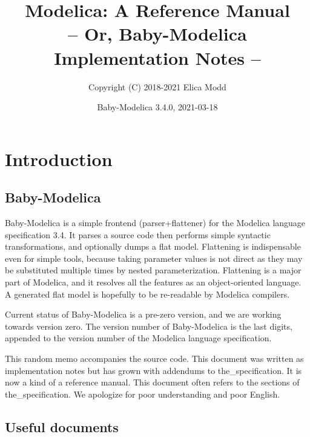 \documentclass[10pt,b5paper]{article}
\title{\bf{}Modelica: A Reference Manual\\
\normalsize{}-- Or, Baby-Modelica Implementation Notes --}
\author{Copyright (C) 2018-2021 Elica Modd}
\date{Baby-Modelica 3.4.0, 2021-03-18}
\begin{document}
\maketitle

\tableofcontents



\section{Introduction}

\subsection{Baby-Modelica}

Baby-Modelica is a simple frontend (parser+flattener) for the Modelica
language specification 3.4.  It parses a source code then performs
simple syntactic transformations, and optionally dumps a flat model.
Flattening is indispensable even for simple tools, because taking
parameter values is not direct as they may be substituted multiple
times by nested parameterization.  Flattening is a major part of
Modelica, and it resolves all the features as an object-oriented
language.  A generated flat model is hopefully to be re-readable by
Modelica compilers.

Current status of Baby-Modelica is a pre-zero version, and we are
working towards version zero.  The version number of Baby-Modelica is
the last digits, appended to the version number of the Modelica
language specification.

This random memo accompanies the source code.  This document was
written as implementation notes but has grown with addendums to
the_specification.  It is now a kind of a reference manual.  This
document often refers to the sections of the_specification.  We
apologize for poor understanding and poor English.


\subsection{Useful documents}
\end{document}
